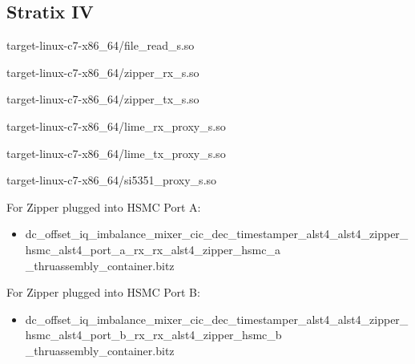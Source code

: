 \documentclass{article}
\begin{document}
\subsection{Stratix IV}
	\begin{itemize}
	\begin{minipage}[t]{.5\textwidth}
	\item target-linux-c7-x86\_64/file\_read\_s.so
	\item target-linux-c7-x86\_64/zipper\_rx\_s.so
	\item target-linux-c7-x86\_64/zipper\_tx\_s.so
	\end{minipage}
	\begin{minipage}[t]{.5\textwidth}
	\item target-linux-c7-x86\_64/lime\_rx\_proxy\_s.so
	\item target-linux-c7-x86\_64/lime\_tx\_proxy\_s.so
	\item target-linux-c7-x86\_64/si5351\_proxy\_s.so
	\end{minipage}
	\end{itemize}
	For Zipper plugged into HSMC Port A:
	\begin{itemize}
		\item dc\_offset\_iq\_imbalance\_mixer\_cic\_dec\_timestamper\_alst4\_alst4\_zipper\_hsmc\_alst4\_port\_a\_rx\_rx\_alst4\_zipper\_hsmc\_a\\ \_thruassembly\_container.bitz
	\end{itemize}
	\noindent For Zipper plugged into HSMC Port B:
	\begin{itemize}
		\item dc\_offset\_iq\_imbalance\_mixer\_cic\_dec\_timestamper\_alst4\_alst4\_zipper\_hsmc\_alst4\_port\_b\_rx\_rx\_alst4\_zipper\_hsmc\_b\\ \_thruassembly\_container.bitz
	\end{itemize}
\end{document}
